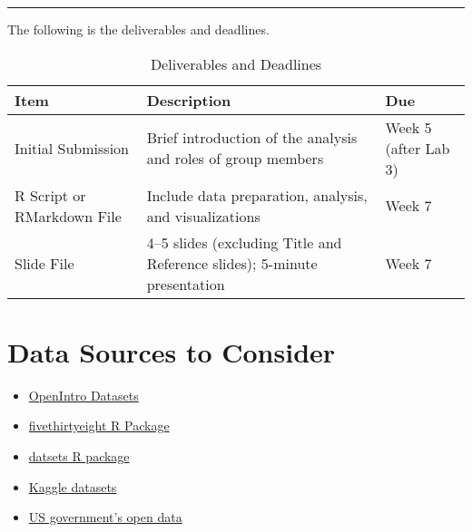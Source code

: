 \documentclass[12pt]{article}
\begin{document}
\begin{center}\rule{16cm}{1pt}\end{center}
The following is the deliverables and deadlines.
\begin{table}[h!]
    \centering
    \begin{tabularx}{\textwidth}{|l|X|l|}
    \hline
    \textbf{Item} & \textbf{Description} & \textbf{Due} \\
    \hline
    Initial Submission & Brief introduction of the analysis and roles of group members & Week 5 (after Lab 3) \\
    \hline
    R Script or RMarkdown File & Include data preparation, analysis, and visualizations & Week 7 \\
    \hline
    Slide File & 4–5 slides (excluding Title and Reference slides); 5-minute presentation & Week 7 \\
    \hline
    \end{tabularx}
    \caption{Deliverables and Deadlines}
    \end{table}


\section*{Data Sources to Consider}
\begin{itemize}
    \item \href{https://www.openintro.org/data/}{OpenIntro Datasets}
    \item \href{https://cran.r-project.org/web/packages/fivethirtyeight/vignettes/fivethirtyeight.html}{fivethirtyeight 
    R Package}
    \item \href{https://stat.ethz.ch/R-manual/R-devel/library/datasets/html/00Index.html}{datsets R package}
    \item \href{https://www.kaggle.com/datasets}{Kaggle datasets}
    \item \href{https://data.gov/}{US government's open data}
\end{itemize}

\end{document}
